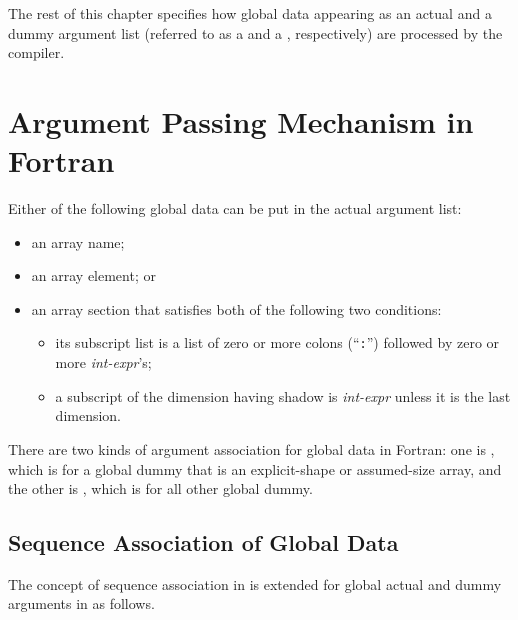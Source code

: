 \vspace{1.5zw}

\hspace{-1.2\parindent}
The rest of this chapter specifies how global data appearing as an
actual and a dummy argument list (referred to as a {\it {}} and a {\it {}}, respectively) are
processed by the {\XMP} compiler.


\section{Argument Passing Mechanism in {\XMP} Fortran}


Either of the following global data can be put in the actual argument list:

\begin{itemize}
 \item an array name;
 \item an array element; or
 \item an array section that satisfies both of the following two
       conditions:
       \begin{itemize}
	\item its subscript list is a list of zero or more colons
	      (``{\tt :}'') followed by zero or more {\it int-expr}'s;
	\item a subscript of the dimension having shadow is {\it
	      int-expr} unless it is the last dimension.
       \end{itemize}
\end{itemize}

There are two kinds of argument association for global data in {\XMP}
Fortran: one is {\it {}}, which is for a global
dummy that is an explicit-shape or assumed-size array, and the other is
{\it {}}, which is for all other global dummy.


\subsection{Sequence Association of Global Data}

The concept of sequence association in {\Fort} is extended for global
actual and dummy arguments in {\XMP} as follows.

